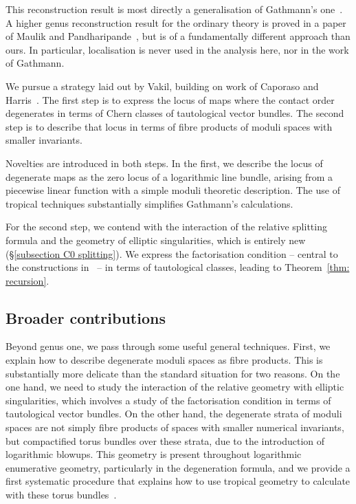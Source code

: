 \documentclass[11pt]{amsart}
\theoremstyle{definition}
\theoremstyle{definition}
\begin{document}
This reconstruction result is most directly a generalisation of Gathmann's one~\cite{Ga}. A higher genus reconstruction result for the ordinary theory is proved in a paper of Maulik and Pandharipande~\cite{MaulikPandharipande}, but is of a fundamentally different approach than ours. In particular, localisation is never used in the analysis here, nor in the work of Gathmann. 

We pursue a strategy laid out by Vakil, building on work of Caporaso and Harris~\cite{CH98,Vre}. The first step is to express the locus of maps where the contact order degenerates in terms of Chern classes of tautological vector bundles. The second step is to describe that locus in terms of fibre products of moduli spaces with smaller invariants. 

Novelties are introduced in both steps. In the first, we describe the locus of degenerate maps as the zero locus of a logarithmic line bundle, arising from a piecewise linear function with a simple moduli theoretic description. The use of tropical techniques substantially simplifies Gathmann's calculations.

For the second step, we contend with the interaction of the relative splitting formula and the geometry of elliptic singularities, which is entirely new (\S \ref{subsection C0 splitting}). We express the factorisation condition -- central to the constructions in~\cite{RSPW,RSPW2} -- in terms of tautological classes, leading to Theorem~\ref{thm: recursion}.

\subsection{Broader contributions} Beyond genus one, we pass through some useful general techniques. First, we explain how to describe degenerate moduli spaces as fibre products. This is substantially more delicate than the standard situation for two reasons. On the one hand, we need to study the interaction of the relative geometry with elliptic singularities, which involves a study of the factorisation condition in terms of tautological vector bundles. On the other hand, the degenerate strata of moduli spaces are not simply fibre products of spaces with smaller numerical invariants, but compactified torus bundles over these strata, due to the introduction of logarithmic blowups. This geometry is present throughout logarithmic enumerative geometry, particularly in the degeneration formula, and we provide a first systematic procedure that explains how to use tropical geometry to calculate with these torus bundles~\cite{R19}.
\end{document}
